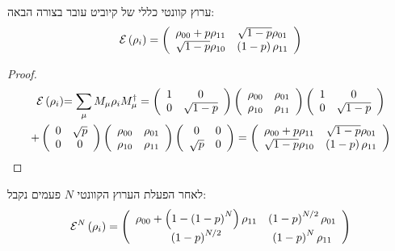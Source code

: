\documentclass{tstextbook}
\begin{document}
\begin{proposition}
ערוץ קוונטי כללי של קיוביט עובר בצורה הבאה:
$$\mathcal{E} \left( \rho_{i} \right)=\left(\begin{array}{c c}{{\rho_{00}+p\rho_{11}}}&{{\sqrt{1-p}\rho_{01}}}\\ {{\sqrt{1-p}\rho_{10}}}&{{\left(1-p\right)\rho_{11}}}\end{array}\right) $$

\end{proposition}
\begin{proof}
$$\begin{gather}{\mathcal{E} \left(\rho_{i}\right)}{=\sum_{\mu}M_{\mu}\rho_{i}M_{\mu}^{\dagger}=\left(\begin{array}{c c}{{1}}&{{0}}\\ {{0}}&{{\sqrt{1-p}}}\end{array}\right)\left(\begin{array}{c c}{{\rho_{00}}}&{{\rho_{01}}}\\ {{\rho_{10}}}&{{\rho_{11}}}\end{array}\right)\left(\begin{array}{c c}{{1}}&{{0}}\\ {{0}}&{{\sqrt{1-p}}}\end{array}\right)}\\ \begin{array}{c c}{{+\left(\begin{array}{c c}{{0}}&{{\sqrt{p}}}\\ {{0}}&{{0}}\end{array}\right)\left(\begin{array}{c c}{{\rho_{00}}}&{{\rho_{01}}}\\ {{\rho_{10}}}&{{\rho_{11}}}\end{array}\right)\left(\begin{array}{c c}{{0}}&{{0}}\\ {{\sqrt{p}}}&{{0}}\end{array}\right)=\left(\begin{array}{c c}{{\rho_{00}+p\rho_{11}}}&{{\sqrt{1-p}\rho_{01}}}\\ {{\sqrt{1-p}\rho_{10}}}&{{\left(1-p\right)\rho_{11}}}\end{array}\right)}}\end{array} 
\end{gather}$$

\end{proof}
\begin{proposition}
לאחר הפעלת הערוץ הקוונטי \(N\) פעמים נקבל:
$$\mathcal{E} ^{N}\left(\rho_{i}\right)=\left(\begin{array}{c c}{{\rho_{00}+\left(1-\left(1-p\right)^{N}\right)\rho_{11}}}&{{\left(1-p\right)^{N/2}\rho_{01}}}\\ {{\left(1-p\right)^{N/2}}}&{{\left(1-p\right)^{N}\rho_{11}}}\end{array}\right)$$

\end{proposition}
\end{document}
